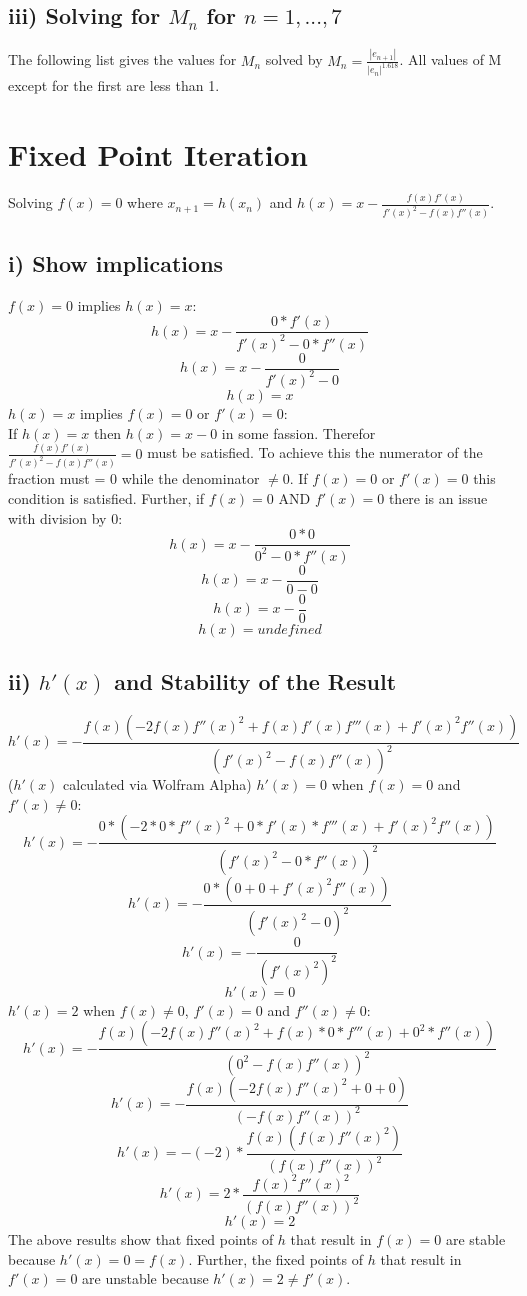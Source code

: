 \documentclass[12pt]{article}
\def\myoutput#1{{\fontsize{10}{11}\selectfont\verbatimtabinput{#1}}}
\begin{document}
\subsection*{iii) Solving for $M_n$ for $n=1,...,7$}
The following list gives the values for $M_n$ solved by $M_n=\frac{|e_{n+1}|}{|e_n|^{1.618}}$.
\myoutput{secantM.out}
\noindent
All values of M except for the first are less than 1.

\section{Fixed Point Iteration}
Solving $f(x)=0$ where $x_{n+1}=h(x_n)$ and $h(x)=x-\frac{f(x)f'(x)}{f'(x)^2-f(x)f''(x)}$.
\subsection*{i) Show implications}
$f(x)=0$ implies $h(x)=x$:
\[h(x)=x-\frac{0*f'(x)}{f'(x)^2-0*f''(x)}\]
\[h(x)=x-\frac{0}{f'(x)^2-0}\]
\[h(x)=x\]
$h(x)=x$ implies $f(x)=0$ or $f'(x)=0$:\\
If $h(x)=x$ then $h(x)=x-0$ in some fassion. Therefor $\frac{f(x)f'(x)}{f'(x)^2-f(x)f''(x)}=0$ must be satisfied. To achieve this the numerator of the fraction must = 0 while the denominator $\neq{0}$. If $f(x)=0$ or $f'(x)=0$ this condition is satisfied. Further, if $f(x)=0$ AND $f'(x)=0$ there is an issue with division by 0:
\[h(x)=x-\frac{0*0}{0^2-0*f''(x)}\]
\[h(x)=x-\frac{0}{0-0}\]
\[h(x)=x-\frac{0}{0}\]
\[h(x)=undefined\]
\subsection*{ii) $h'(x)$ and Stability of the Result}
\[h'(x)=-\frac{f(x)(-2f(x)f''(x)^2+f(x)f'(x)f'''(x)+f'(x)^2f''(x))}{(f'(x)^2-f(x)f''(x))^2}\]
($h'(x)$ calculated via Wolfram Alpha)
\newpage
\noindent
$h'(x)=0$ when $f(x)=0$ and $f'(x)\neq{0}$:
\[h'(x)=-\frac{0*(-2*0*f''(x)^2+0*f'(x)*f'''(x)+f'(x)^2f''(x))}{(f'(x)^2-0*f''(x))^2}\]
\[h'(x)=-\frac{0*(0+0+f'(x)^2f''(x))}{(f'(x)^2-0)^2}\]
\[h'(x)=-\frac{0}{(f'(x)^2)^2}\]
\[h'(x)=0\]
$h'(x)=2$ when $f(x)\neq{0}$, $f'(x)=0$ and $f''(x)\neq{0}$:
\[h'(x)=-\frac{f(x)(-2f(x)f''(x)^2+f(x)*0*f'''(x)+0^2*f''(x))}{(0^2-f(x)f''(x))^2}\]
\[h'(x)=-\frac{f(x)(-2f(x)f''(x)^2+0+0)}{(-f(x)f''(x))^2}\]
\[h'(x)=-(-2)*\frac{f(x)(f(x)f''(x)^2)}{(f(x)f''(x))^2}\]
\[h'(x)=2*\frac{f(x)^2f''(x)^2}{(f(x)f''(x))^2}\]
\[h'(x)=2\]
The above results show that fixed points of $h$ that result in $f(x)=0$ are stable because $h'(x)=0=f(x)$. Further, the fixed points of $h$ that result in $f'(x)=0$ are unstable because $h'(x)=2\neq{f'(x)}$.
\end{document}
